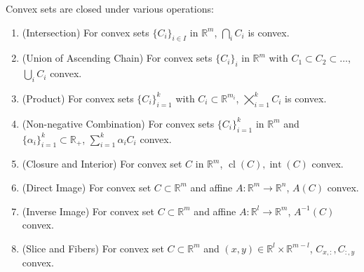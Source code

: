 \begin{prop}\label{prop:011-conv-yoga}
	Convex sets are closed under various operations:
	\begin{enumerate}[label=(\alph*)]
		\item (Intersection) For convex sets $\{C_i\}_{i\in I}$ in $\mathbb{R}^m$, $\bigcap_iC_i$ is convex.
		\item (Union of Ascending Chain) For convex sets $\{C_i\}_{i}$ in $\mathbb{R}^m$ with $C_1\subset C_2\subset\dotsc$, $\bigcup_iC_i$ convex.
		\item (Product) For convex sets $\{C_i\}_{i=1}^k$ with $C_i\subset \mathbb{R}^{m_i}$, $\bigtimes_{i=1}^kC_i$ is convex.
		\item (Non-negative Combination) For convex sets $\{C_i\}_{i=1}^k$ in $\mathbb{R}^m$ and $\{\alpha_i\}_{i=1}^k\subset \mathbb{R}_{+}$, $\sum_{i=1}^k\alpha_iC_i$ convex.
		\item (Closure and Interior) For convex set $C$ in $\mathbb{R}^m$, $\operatorname{cl}(C),\operatorname{int}(C)$ convex.
		\item (Direct Image) For convex set $C\subset \mathbb{R}^m$ and affine $A:\mathbb{R}^m\to \mathbb{R}^n$, $A(C)$ convex.
		\item (Inverse Image) For convex set $C\subset \mathbb{R}^m$ and affine $A:\mathbb{R}^l\to \mathbb{R}^m$, $A^{-1}(C)$ convex.
		\item (Slice and Fibers) For convex set $C\subset \mathbb{R}^m$ and $(x,y)\in \mathbb{R}^l\times \mathbb{R}^{m-l}$, $C_{x,:},C_{:,y}$ convex.
	\end{enumerate}
\end{prop}
